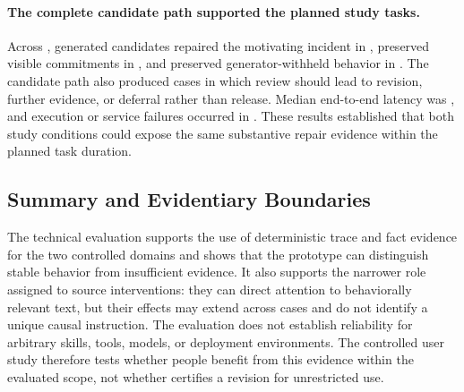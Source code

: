 \paragraph{The complete candidate path supported the planned study tasks.}
Across , generated
candidates repaired the motivating incident in
, preserved visible commitments in
, and preserved generator-withheld
behavior in . The candidate path also
produced  cases in which review should lead to revision, further evidence, or
deferral rather than release. Median end-to-end latency was
, and execution or service failures
occurred in . These results established that both
study conditions could expose the same substantive repair evidence within the
planned task duration.

\subsection{Summary and Evidentiary Boundaries}

The technical evaluation supports the use of deterministic trace and fact
evidence for the two controlled domains and shows that the prototype can
distinguish stable behavior from insufficient evidence. It also supports the
narrower role assigned to source interventions: they can direct attention to
behaviorally relevant text, but their effects may extend across cases and do
not identify a unique causal instruction. The evaluation does not establish
reliability for arbitrary skills, tools, models, or deployment environments.
The controlled user study therefore tests whether people benefit from this
evidence within the evaluated scope, not whether \systemname{} certifies a
revision for unrestricted use.
